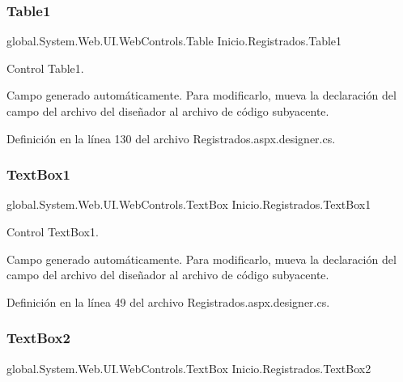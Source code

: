 \mbox{\label{classInicio_1_1Registrados_a0c8cbd7625175b47e930f927da038acc}} 
\subsubsection{\texorpdfstring{Table1}{Table1}}
{\footnotesize\ttfamily global.\+System.\+Web.\+U\+I.\+Web\+Controls.\+Table Inicio.\+Registrados.\+Table1\hspace{0.3cm}{\ttfamily [protected]}}



Control Table1. 

Campo generado automáticamente. Para modificarlo, mueva la declaración del campo del archivo del diseñador al archivo de código subyacente. 

Definición en la línea 130 del archivo Registrados.\+aspx.\+designer.\+cs.

\mbox{\label{classInicio_1_1Registrados_a2ec529c41bccbe1d45b53e29aad8d1f4}} 
\subsubsection{\texorpdfstring{TextBox1}{TextBox1}}
{\footnotesize\ttfamily global.\+System.\+Web.\+U\+I.\+Web\+Controls.\+Text\+Box Inicio.\+Registrados.\+Text\+Box1\hspace{0.3cm}{\ttfamily [protected]}}



Control Text\+Box1. 

Campo generado automáticamente. Para modificarlo, mueva la declaración del campo del archivo del diseñador al archivo de código subyacente. 

Definición en la línea 49 del archivo Registrados.\+aspx.\+designer.\+cs.

\mbox{\label{classInicio_1_1Registrados_a14706b4c2eeec2fe1d93f7d0ae00993c}} 
\subsubsection{\texorpdfstring{TextBox2}{TextBox2}}
{\footnotesize\ttfamily global.\+System.\+Web.\+U\+I.\+Web\+Controls.\+Text\+Box Inicio.\+Registrados.\+Text\+Box2\hspace{0.3cm}{\ttfamily [protected]}}



